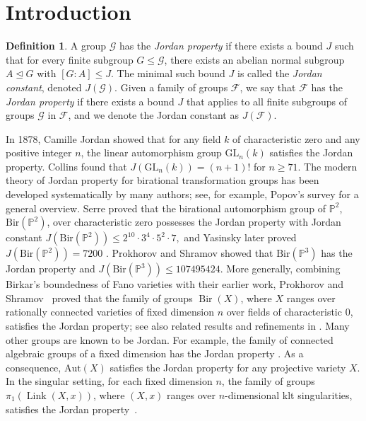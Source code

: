 \documentclass[a4paper,12pt,oneside]{amsart}
\numberwithin{equation}{section}
\theoremstyle{definition}
\newtheorem{definition}[theorem]{Definition}
\theoremstyle{remark}
\newcommand{\GL}{\mathrm{GL}}
\begin{document}
\section{Introduction}
\begin{definition}
A group $\mathcal{G}$ has the \emph{Jordan property}
if there exists a bound $J$ such that for every finite subgroup
$G \le \mathcal{G}$, there exists an abelian normal subgroup $A \trianglelefteq G$ with
\(
[G : A] \le J.
\)
The minimal such bound $J$ is called the \emph{Jordan constant}, denoted $J(\mathcal{G})$. Given a family of groups $\mathcal{F}$, we say that $\mathcal{F}$ has the \emph{Jordan property} if there exists a bound $J$ that applies to all finite subgroups of groups $\mathcal{G}$ in $\mathcal{F}$, and we denote the Jordan constant as $J(\mathcal{F})$.
\end{definition}
In 1878, Camille Jordan \cite{Jordan1878} showed that for any field $k$ of characteristic zero and any positive integer $n$, the linear automorphism group $\mathrm{GL}_n(k)$ satisfies the Jordan property. Collins \cite{Collins2007} found  that $J(\GL_n(k))=(n+1)!$ for $n \geq 71$. The modern theory of Jordan property for birational transformation groups has been developed systematically by many authors; see, for example, Popov's survey \cite{Popov2014JordanGroups} for a general overview. Serre \cite{serre2009minkowskistyleboundorderfinite} proved that the birational automorphism group of $\mathbb{P}^2$, $\mathrm{Bir}(\mathbb{P}^2)$, over characteristic zero possesses the Jordan property with Jordan constant
$
J(\mathrm{Bir}(\mathbb{P}^2)) \leq 2^{10} \cdot 3^4 \cdot 5^2 \cdot 7,
$
and Yasinsky later proved $J(\mathrm{Bir}(\mathbb{P}^2))=7200$ \cite{yasinsky2023jordanconstantcremonagroup}. Prokhorov and Shramov \cite{prok17} showed that $\mathrm{Bir}(\mathbb{P}^3)$ has the Jordan property and $J(\mathrm{Bir}(\mathbb{P}^3))\leq 107495424$. More generally, combining Birkar's boundedness of Fano varieties with their earlier work, Prokhorov and Shramov~\cite{prokhorov2014jordanpropertycremonagroups} proved that the family of groups \(\operatorname{Bir}(X)\), where \(X\) ranges over rationally connected varieties of fixed dimension \(n\) over fields of characteristic \(0\), satisfies the Jordan property; see also related results and refinements in \cite{BandmanZarhin2015JordanSurfaces,MengPerroniZhang2018JordanAut}. Many other groups are known to be Jordan. For example, the family of connected algebraic groups of a fixed dimension has the Jordan property \cite{luo2025jordanpropertyautomorphismgroups,MengZhang2018JordanNonlinear}. As a consequence, $\mathrm{Aut}(X)$ satisfies the Jordan property for any projective variety $X$. In the singular setting, for each fixed dimension \(n\), the family of groups \(\pi_1(\operatorname{Link}(X,x))\), where \((X,x)\) ranges over \(n\)-dimensional klt singularities, satisfies the Jordan property~\cite{BraunFilipazziMoragaSvaldi2022}.
\end{document}
